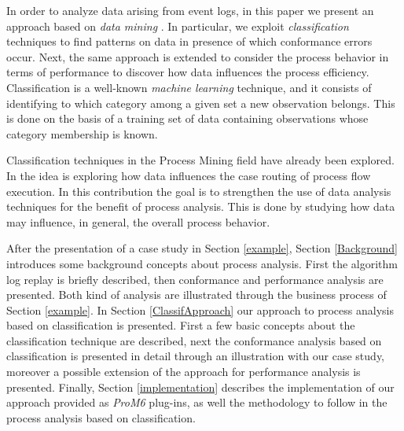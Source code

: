 \documentclass{llncs}
\begin{document}
In order to analyze data arising from event logs, in this paper we present an approach based on \emph{data mining} \cite{5}. In particular, we exploit \emph{classification} techniques to find patterns on data in presence of which conformance errors occur. Next, the same approach is extended to consider the process behavior in terms of performance to discover how data influences the process efficiency. Classification is a well-known \emph{machine learning} technique, and it consists of identifying to which category among a given set a new observation belongs. This is done on the basis of a training set of data containing observations whose category membership is known.

Classification techniques in the Process Mining field have already been explored. In \cite{1} the idea is exploring how data influences the case routing of process flow execution. In this contribution the goal is to strengthen the use of data analysis techniques for the benefit of process analysis. This is done by studying how data may influence, in general, the overall process behavior.

After the presentation of a case study in Section \ref{example},
Section \ref{Background} introduces some background concepts about
process analysis. First the algorithm log replay is briefly described,
then conformance and performance analysis are presented. Both kind of
analysis are illustrated through the business process of Section
\ref{example}. In Section \ref{ClassifApproach} our approach to
process analysis based on classification is presented. First a few
basic concepts about the classification technique are described, next
the conformance analysis based on classification is presented in
detail through an illustration with our case study, moreover a
possible extension of the approach for performance analysis is
presented. Finally, Section \ref{implementation} describes the
implementation of our approach provided as \emph{ProM6}\cite{6} plug-ins, as well the methodology to follow in the process analysis based on classification.
\end{document}
